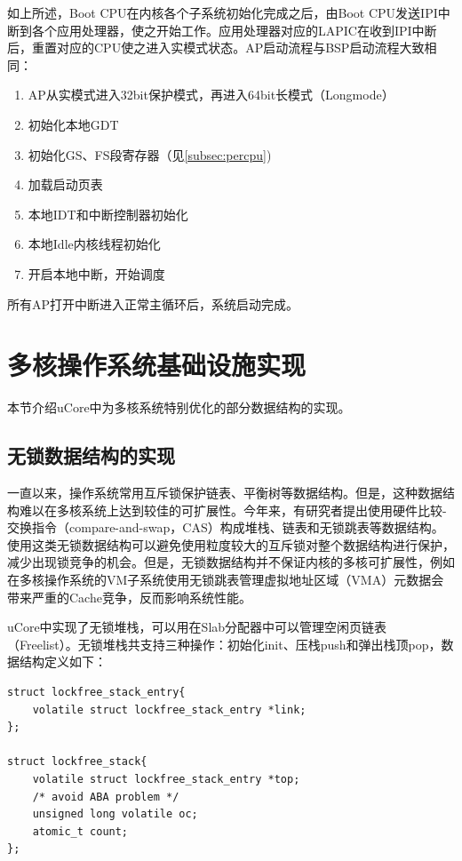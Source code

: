 如上所述，Boot CPU在内核各个子系统初始化完成之后，由Boot CPU发送IPI中断到各个应用处理器，使之开始工作。应用处理器对应的LAPIC在收到IPI中断后，重置对应的CPU使之进入实模式状态。AP启动流程与BSP启动流程大致相同：

\begin{enumerate}
\item AP从实模式进入32bit保护模式，再进入64bit长模式（Longmode）
\item 初始化本地GDT
\item 初始化GS、FS段寄存器（见\ref{subsec:percpu})
\item 加载启动页表
\item 本地IDT和中断控制器初始化
\item 本地Idle内核线程初始化
\item 开启本地中断，开始调度
\end{enumerate}

所有AP打开中断进入正常主循环后，系统启动完成。

\section{多核操作系统基础设施实现}
本节介绍uCore中为多核系统特别优化的部分数据结构的实现。

\subsection{无锁数据结构的实现}
一直以来，操作系统常用互斥锁保护链表、平衡树等数据结构。但是，这种数据结构难以在多核系统上达到较佳的可扩展性。今年来，有研究者\cite{Fraser:2007:CPW:1233307.1233309}提出使用硬件比较-交换指令（compare-and-swap，CAS）构成堆栈、链表和无锁跳表等数据结构。使用这类无锁数据结构可以避免使用粒度较大的互斥锁对整个数据结构进行保护，减少出现锁竞争的机会。但是，无锁数据结构并不保证内核的多核可扩展性，例如在多核操作系统的VM子系统使用无锁跳表管理虚拟地址区域（VMA）元数据会带来严重的Cache竞争\cite{radixvm:eurosys13}，反而影响系统性能。

uCore中实现了无锁堆栈，可以用在Slab分配器中可以管理空闲页链表（Freelist）。无锁堆栈共支持三种操作：初始化init、压栈push和弹出栈顶pop，数据结构定义如下：

\begin{lstlisting}
struct lockfree_stack_entry{
	volatile struct lockfree_stack_entry *link;
};

struct lockfree_stack{
	volatile struct lockfree_stack_entry *top;
	/* avoid ABA problem */
	unsigned long volatile oc;
	atomic_t count;
};
\end{lstlisting}

